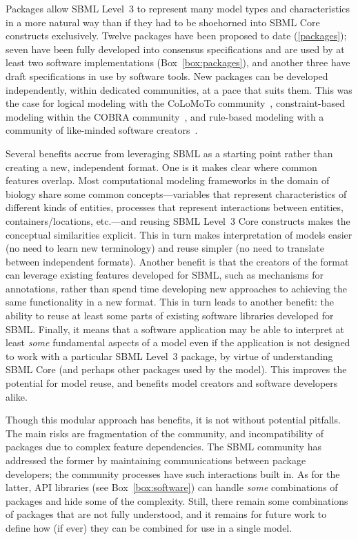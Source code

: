 \documentclass{sbml-paper}
\begin{document}
Packages allow SBML Level~3 to represent many model types and characteristics in a more natural way than if they had to be shoehorned into SBML Core constructs exclusively.  Twelve packages have been proposed to date (\autoref{packages}); seven have been fully developed into consensus specifications and are used by at least two software implementations (Box~\ref{box:packages}), and another three have draft specifications in use by software tools.  New packages can be developed independently, within dedicated communities, at a pace that suits them.  This was the case for logical modeling with the CoLoMoTo community~\citep{naldi2015cooperative}, constraint-based modeling within the COBRA community~\citep{Ebrahim2015}, and rule-based modeling with a community of like-minded software creators~\citep{Blinov2004, Palmisano2014multistate, zhang2013simmune}.

Several benefits accrue from leveraging SBML as a starting point rather than creating a new, independent format.  One is it makes clear where common features overlap.  Most computational modeling frameworks in the domain of biology share some common concepts---variables that represent characteristics of different kinds of entities, processes that represent interactions between entities, containers/locations, etc.---and reusing SBML Level~3 Core constructs makes the conceptual similarities explicit.  This in turn makes interpretation of models easier (no need to learn new terminology) and reuse simpler (no need to translate between independent formats).  Another benefit is that the creators of the format can leverage existing features developed for SBML, such as mechanisms for annotations, rather than spend time developing new approaches to achieving the same functionality in a new format.  This in turn leads to another benefit: the ability to reuse at least some parts of existing software libraries developed for SBML.  Finally, it means that a software application may be able to interpret at least \emph{some} fundamental aspects of a model even if the application is not designed to work with a particular SBML Level~3 package, by virtue of understanding SBML Core (and perhaps other packages used by the model).  This improves the potential for model reuse, and benefits model creators and software developers alike.

Though this modular approach has benefits, it is not without potential pitfalls.  The main risks are fragmentation of the community, and incompatibility of packages due to complex feature dependencies.  The SBML community has addressed the former by maintaining communications between package developers; the community processes have such interactions built in.  As for the latter, API libraries (see Box~\ref{box:software}) can handle \emph{some} combinations of packages and hide some of the complexity.  Still, there remain some combinations of packages that are not fully understood, and it remains for future work to define how (if ever) they can be combined for use in a single model.
\end{document}
